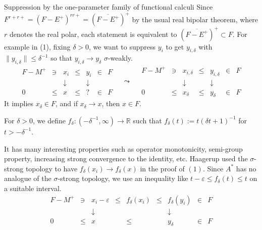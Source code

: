 \documentclass{../../../../slide}
\begin{document}
\begin{frame}{Suppression by the one-parameter family of functional calculi}
Since $F^{r+r+}=(F-E^+)^{rr+}=(\overline{F-E^+})^+$ by the usual real bipolar theorem, where $r$ denotes the real polar, each statement is equivalent to $(\overline{F-E^+})^+\subset F$.
For example in (1), fixing $\delta>0$, we want to suppress $y_i$ to get $y_{i,\delta}$ with $\|y_{i,\delta}\|\le\delta^{-1}$ so that $y_{i,\delta}\to y_\delta$ $\sigma$-weakly.
\[\begin{array}{ccccccc}
F-M^+ & \ni & x_i & \le & y_i & \in & F \\
&& \downarrow && \downarrow &&\\
0 & \le & x & \le & ? & \in & F
\end{array}
\quad\leadsto\quad
\begin{array}{ccccccc}
F-M^+ & \ni & x_{i,\delta} & \le & y_{i,\delta} & \in & F \\
&& \downarrow && \downarrow &&\\
0 & \le & x_\delta & \le & y_\delta & \in & F
\end{array}\]
It implies $x_\delta\in F$, and if $x_\delta\to x$, then $x\in F$.
\pause
\begin{defn}
For $\delta>0$, we define $f_\delta:(-\delta^{-1},\infty)\to\mathbb{R}$ such that $f_\delta(t):=t(\delta t+1)^{-1}$ for $t>-\delta^{-1}$.
\end{defn}
It has many interesting properties such as operator monotonicity, semi-group property, increasing strong convergence to the identity, etc.
Haagerup used the $\sigma$-strong topology to have $f_\delta(x_i)\to f_\delta(x)$ in the proof of $(1)$.
\pause
Since $A^*$ has no analogue of the $\sigma$-strong topology, we use an inequality like $t-\varepsilon\le f_\delta(t)\le t$ on a suitable interval.
\[\begin{array}{ccccccccc}
F-M^+ & \ni & x_i-\varepsilon & \le & f_\delta(x_i) & \le & f_\delta(y_i) & \in & F \\
&& \downarrow && && \downarrow &&\\
0 & \le & x && \le && y_\delta & \in & F
\end{array}\]
\end{frame}
\end{document}
